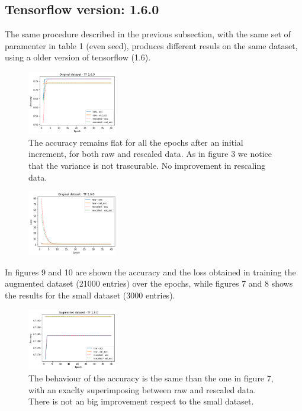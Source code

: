 \documentclass[prl,twocolumn]{revtex4-1}
\begin{document}
\subsection{Tensorflow version:  1.6.0}
The same procedure described in the previous subsection, with the same set of paramenter in table 1 (even seed), produces different resuls on the same dataset, using a older version of tensorflow (1.6). \newpage
\begin{figure}[h!!!]
	\includegraphics[width=0.35\textwidth]{small_oldTF.png}
	\caption{The accuracy remains flat for all the epochs after an initial increment, for both raw and rescaled data. As in figure 3 we notice that the variance is not trascurable. No improvement in rescaling data.}
	\label{fig:y}
\end{figure}
\begin{figure}[h!!!]
	\includegraphics[width=0.35\textwidth]{small_oldTFloss.png}
	\caption{}
	\label{fig:y}
\end{figure}
In figures 9 and 10 are shown the accuracy and the loss obtained in training the augmented dataset (21000 entries) over the epochs, while figures 7 and 8 shows the results for the small dataset (3000 entries).
\begin{figure}[h!!]
	\includegraphics[width=0.35\textwidth]{aug_oldTF.png}
	\caption{The behaviour of the accuracy is the same than the one in figure 7, with an exaclty superimposing between raw and rescaled data. There is not an big improvement respect to the small dataset.}
	\label{fig:y}
\end{figure}
\end{document}
